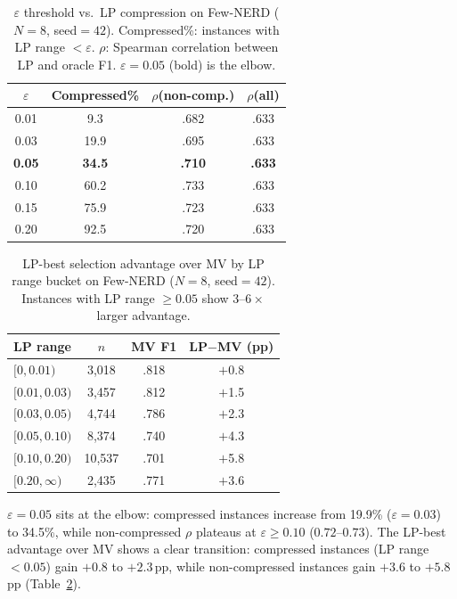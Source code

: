 \begin{table}[ht!]
\centering
\small
\caption{$\varepsilon$ threshold vs.\ LP compression on Few-NERD ($N{=}8$, seed${=}42$). Compressed\%: instances with LP range ${<}\varepsilon$. $\rho$: Spearman correlation between LP and oracle F1. $\varepsilon{=}0.05$ (bold) is the elbow.}
\label{tab:fewnerd_epsilon}
\begin{tabular}{cccc}
\toprule
$\varepsilon$ & Compressed\% & $\rho$(non-comp.) & $\rho$(all) \\
\midrule
0.01 & 9.3 & .682 & .633 \\
0.03 & 19.9 & .695 & .633 \\
\textbf{0.05} & \textbf{34.5} & \textbf{.710} & \textbf{.633} \\
0.10 & 60.2 & .733 & .633 \\
0.15 & 75.9 & .723 & .633 \\
0.20 & 92.5 & .720 & .633 \\
\bottomrule
\end{tabular}
\end{table}

\begin{table}[ht!]
\centering
\small
\caption{LP-best selection advantage over MV by LP range bucket on Few-NERD ($N{=}8$, seed${=}42$). Instances with LP range ${\geq}0.05$ show $3$--$6{\times}$ larger advantage.}
\label{tab:fewnerd_lp_bucket}
\begin{tabular}{lccc}
\toprule
LP range & $n$ & MV F1 & LP$-$MV (pp) \\
\midrule
$[0, 0.01)$ & 3{,}018 & .818 & $+$0.8 \\
$[0.01, 0.03)$ & 3{,}457 & .812 & $+$1.5 \\
$[0.03, 0.05)$ & 4{,}744 & .786 & $+$2.3 \\
\midrule
$[0.05, 0.10)$ & 8{,}374 & .740 & $+$4.3 \\
$[0.10, 0.20)$ & 10{,}537 & .701 & $+$5.8 \\
$[0.20, \infty)$ & 2{,}435 & .771 & $+$3.6 \\
\bottomrule
\end{tabular}
\end{table}

$\varepsilon{=}0.05$ sits at the elbow: compressed instances increase from 19.9\% ($\varepsilon{=}0.03$) to 34.5\%, while non-compressed $\rho$ plateaus at $\varepsilon{\geq}0.10$ ($0.72$--$0.73$).
The LP-best advantage over MV shows a clear transition: compressed instances (LP range${<}0.05$) gain $+0.8$ to $+2.3$\,pp, while non-compressed instances gain $+3.6$ to $+5.8$\,pp (Table~\ref{tab:fewnerd_lp_bucket}).

